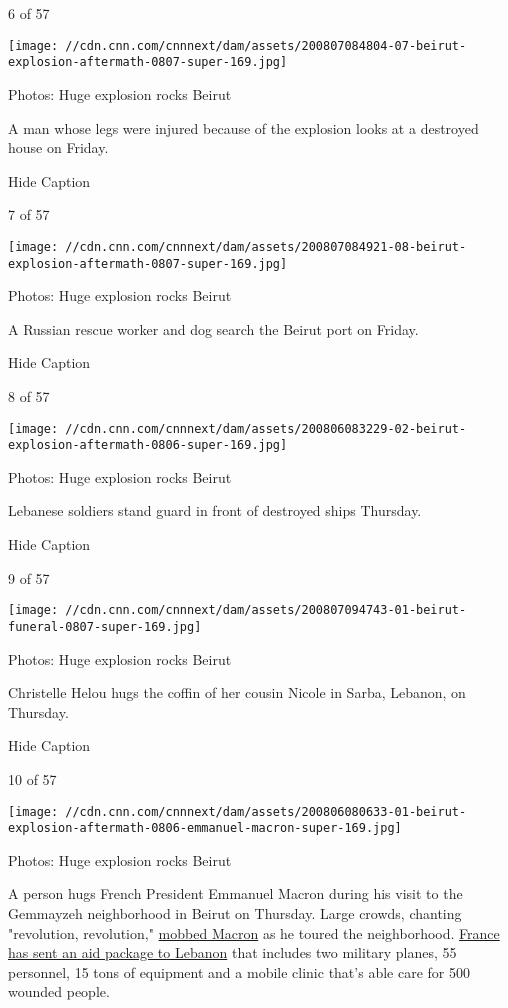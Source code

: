 6 of 57

\texttt{[image: //cdn.cnn.com/cnnnext/dam/assets/200807084804-07-beirut-explosion-aftermath-0807-super-169.jpg]}

Photos: Huge explosion rocks Beirut

A man whose legs were injured because of the explosion looks at a
destroyed house on Friday.

Hide Caption

7 of 57

\texttt{[image: //cdn.cnn.com/cnnnext/dam/assets/200807084921-08-beirut-explosion-aftermath-0807-super-169.jpg]}

Photos: Huge explosion rocks Beirut

A Russian rescue worker and dog search the Beirut port on Friday.

Hide Caption

8 of 57

\texttt{[image: //cdn.cnn.com/cnnnext/dam/assets/200806083229-02-beirut-explosion-aftermath-0806-super-169.jpg]}

Photos: Huge explosion rocks Beirut

Lebanese soldiers stand guard in front of destroyed ships Thursday.

Hide Caption

9 of 57

\texttt{[image: //cdn.cnn.com/cnnnext/dam/assets/200807094743-01-beirut-funeral-0807-super-169.jpg]}

Photos: Huge explosion rocks Beirut

Christelle Helou hugs the coffin of her cousin Nicole in Sarba, Lebanon,
on Thursday.

Hide Caption

10 of 57

\texttt{[image: //cdn.cnn.com/cnnnext/dam/assets/200806080633-01-beirut-explosion-aftermath-0806-emmanuel-macron-super-169.jpg]}

Photos: Huge explosion rocks Beirut

A person hugs French President Emmanuel Macron during his visit to the
Gemmayzeh neighborhood in Beirut on Thursday. Large crowds, chanting
"revolution, revolution,"
\href{https://www.cnn.com/2020/08/06/middleeast/beirut-explosion-anger-intl-hnk/index.html}{mobbed
Macron} as he toured the neighborhood.
\href{https://www.cnn.com/middleeast/live-news/beirut-lebanon-explosion-08-06-2020/h_8e4d94733d3dd5c37c7d0cc1c364fb8c}{France
has sent an aid package to Lebanon} that includes two military planes,
55 personnel, 15 tons of equipment and a mobile clinic that's able care
for 500 wounded people.

